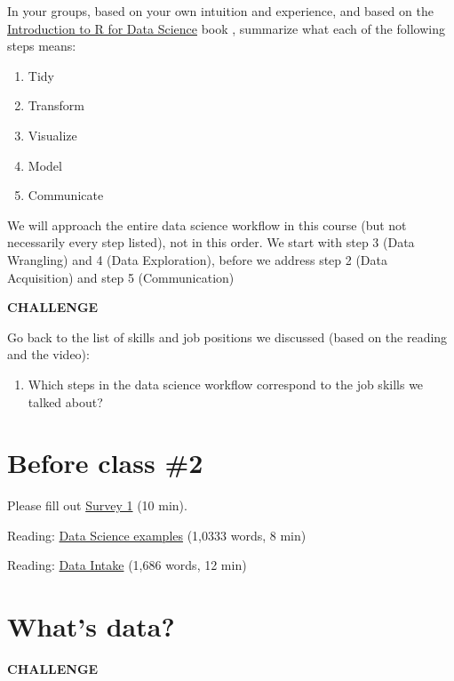 \documentclass[
]{book}
\providecommand{\tightlist}{%
  \setlength{\itemsep}{0pt}\setlength{\parskip}{0pt}}
\begin{document}
In your groups, based on your own intuition and experience, and based on the \href{https://r4ds.had.co.nz/introduction.html}{Introduction to R for Data Science} book \citep{grolemund2018r}, summarize what each of the following steps means:

\begin{enumerate}
\def\labelenumi{\arabic{enumi})}
\item
  Tidy
\item
  Transform
\item
  Visualize
\item
  Model
\item
  Communicate
\end{enumerate}

We will approach the entire data science workflow in this course (but not necessarily every step listed), not in this order. We start with step 3 (Data Wrangling) and 4 (Data Exploration), before we address step 2 (Data Acquisition) and step 5 (Communication)

\textbf{CHALLENGE}

Go back to the list of skills and job positions we discussed (based on the reading and the video):

\begin{enumerate}
\def\labelenumi{\arabic{enumi})}
\tightlist
\item
  Which steps in the data science workflow correspond to the job skills we talked about?
\end{enumerate}

\hypertarget{before-class-2}{%
\section{Before class \#2}\label{before-class-2}}

Please fill out \href{https://forms.gle/NaqrC87cB8xh6Sdz8}{Survey 1} (10 min).

Reading: \href{readings/module2_eds_leek_whatsdatascience.pdf}{Data Science examples} (1,0333 words, 8 min)

Reading: \href{readings/module2_modern_data_science_data_intake.pdf}{Data Intake} (1,686 words, 12 min)

\hypertarget{whats-data}{%
\section{What's data?}\label{whats-data}}

\textbf{CHALLENGE}
\end{document}
